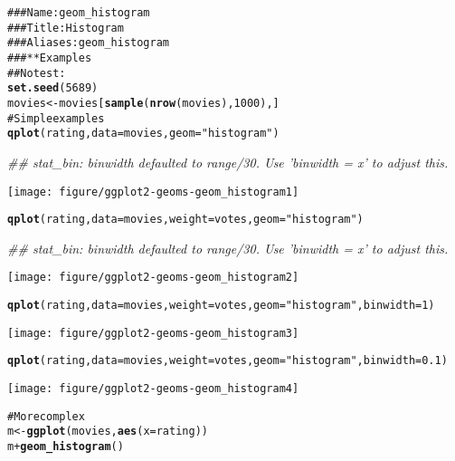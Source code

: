 \documentclass[a4paper,titlepage]{tufte-handout}\usepackage{graphicx, color}
\makeatletter
\def\maxwidth{ %
  \ifdim\Gin@nat@width>\linewidth
    \linewidth
  \else
    \Gin@nat@width
  \fi
}
\newcommand{\hlfunctioncall}[1]{\textcolor[rgb]{0.501960784313725,0,0.329411764705882}{\textbf{#1}}}%
\newcommand{\hlstring}[1]{\textcolor[rgb]{0.6,0.6,1}{#1}}%
\newcommand{\hlcomment}[1]{\textcolor[rgb]{0.180392156862745,0.6,0.341176470588235}{#1}}%
\newenvironment{kframe}{%
 \def\at@end@of@kframe{}%
 \ifinner\ifhmode%
  \def\at@end@of@kframe{\end{minipage}}%
  \begin{minipage}{\columnwidth}%
 \fi\fi%
 \def\FrameCommand##1{\hskip\@totalleftmargin \hskip-\fboxsep
 \colorbox{shadecolor}{##1}\hskip-\fboxsep
     \hskip-\linewidth \hskip-\@totalleftmargin \hskip\columnwidth}%
 \MakeFramed {\advance\hsize-\width
   \@totalleftmargin\z@ \linewidth\hsize
   \@setminipage}}%
 {\par\unskip\endMakeFramed%
 \at@end@of@kframe}
\newenvironment{knitrout}{}{} %
\makeatother
\begin{document}
\begin{knitrout}
\color{fgcolor}\begin{kframe}
\begin{alltt}
\hlcomment{### Name: geom_histogram}
\hlcomment{### Title: Histogram}
\hlcomment{### Aliases: geom_histogram}
\hlcomment{### ** Examples}
\hlcomment{## No test: }
\hlfunctioncall{set.seed}(5689)
movies <- movies[\hlfunctioncall{sample}(\hlfunctioncall{nrow}(movies), 1000), ]
\hlcomment{# Simple examples}
\hlfunctioncall{qplot}(rating, data=movies, geom=\hlstring{"histogram"})
\end{alltt}


{\ttfamily\noindent\itshape\textcolor{messagecolor}{\#\# stat\_bin: binwidth defaulted to range/30. Use 'binwidth = x' to adjust this.}}\end{kframe}\texttt{[image: figure/ggplot2-geoms-geom\_histogram1]} \begin{kframe}\begin{alltt}
\hlfunctioncall{qplot}(rating, data=movies, weight=votes, geom=\hlstring{"histogram"})
\end{alltt}


{\ttfamily\noindent\itshape\textcolor{messagecolor}{\#\# stat\_bin: binwidth defaulted to range/30. Use 'binwidth = x' to adjust this.}}\end{kframe}\texttt{[image: figure/ggplot2-geoms-geom\_histogram2]} \begin{kframe}\begin{alltt}
\hlfunctioncall{qplot}(rating, data=movies, weight=votes, geom=\hlstring{"histogram"}, binwidth=1)
\end{alltt}
\end{kframe}\texttt{[image: figure/ggplot2-geoms-geom\_histogram3]} \begin{kframe}\begin{alltt}
\hlfunctioncall{qplot}(rating, data=movies, weight=votes, geom=\hlstring{"histogram"}, binwidth=0.1)
\end{alltt}
\end{kframe}\texttt{[image: figure/ggplot2-geoms-geom\_histogram4]} \begin{kframe}\begin{alltt}
\hlcomment{# More complex}
m <- \hlfunctioncall{ggplot}(movies, \hlfunctioncall{aes}(x=rating))
m + \hlfunctioncall{geom_histogram}()
\end{alltt}



\end{kframe}
\end{knitrout}
\end{document}
